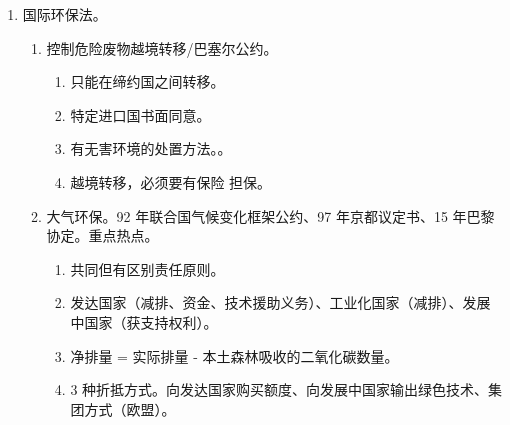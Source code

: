 \begin{enumerate}
        \begin{kk}{外空}
          航空器能到达的高度。
          \begin{enumerate}
            \item 登记制度。秘书长处登记。法律后果。是管辖权和所有权的依据。
            \item 营救制度。援助、通知、送回。
            \item 责任制度。责任主体发射国扩大解释。。
                  \begin{enumerate}
                    \item 外空对外空过错责任；外空对空、地绝对责任。。
                    \item 单方过错单方承担，都有过错按比例，没有过错损失自担。
                    \item 不调整缔约国和本国国民、缔约国和受邀参与发射活动的外国人。。
                  \end{enumerate}
          \end{enumerate}
        \end{kk}
  \item 国际环保法。
        \begin{enumerate}
          \item 控制危险废物越境转移/巴塞尔公约。
                \begin{enumerate}
                  \item 只能在缔约国之间转移。
                  \item 特定进口国书面同意。
                  \item 有无害环境的处置方法。。
                  \item 越境转移，必须要有保险 \hz 担保。
                \end{enumerate}
          \item 大气环保。92 年联合国气候变化框架公约、97 年京都议定书、15 年巴黎协定。重点热点。
                \begin{enumerate}
                  \item 共同但有区别责任原则。
                  \item 发达国家（减排、资金、技术援助义务）、工业化国家（减排）、发展中国家（获支持权利）。
                  \item 净排量 = 实际排量 - 本土森林吸收的二氧化碳数量。
                  \item 3 种折抵方式。向发达国家购买额度、向发展中国家输出绿色技术、集团方式（欧盟）。

\end{enumerate}
\end{enumerate}
\end{enumerate}
